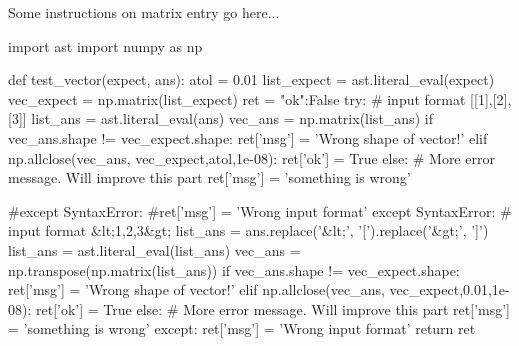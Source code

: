 Some instructions on matrix entry go here...

\begin{edXscript}
import ast
import numpy as np 
  
def test_vector(expect, ans):
  	atol = 0.01
	list_expect = ast.literal_eval(expect)
	vec_expect = np.matrix(list_expect)
  	ret = {"ok":False}
	try:
  		# input format [[1],[2],[3]]
		list_ans = ast.literal_eval(ans)
		vec_ans = np.matrix(list_ans)
  		if vec_ans.shape != vec_expect.shape:
  			ret['msg'] = 'Wrong shape of vector!'
  		elif np.allclose(vec_ans, vec_expect,atol,1e-08):
  			ret['ok'] = True
  		else:
  		# More error message. Will improve this part
  			ret['msg'] = 'something is wrong' 
  			
	#except SyntaxError:
		#ret['msg'] = 'Wrong input format'
	except SyntaxError:
  		# input format &lt;1,2,3&gt;
		list_ans = ans.replace('&lt;', '[').replace('&gt;', ']')
		list_ans = ast.literal_eval(list_ans)
		vec_ans = np.transpose(np.matrix(list_ans))
  		if vec_ans.shape != vec_expect.shape:
  			ret['msg'] = 'Wrong shape of vector!'
  		elif np.allclose(vec_ans, vec_expect,0.01,1e-08):
  			ret['ok'] = True
  		else:
    		# More error message. Will improve this part
  			ret['msg'] = 'something is wrong' 
  	except:
  		ret['msg'] = 'Wrong input format'
  	return ret
  
\end{edXscript}
